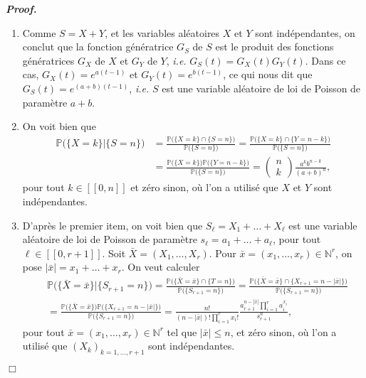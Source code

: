 \documentclass[11pt,a4paper]{article}
\newcommand{\NN}{\mathbb{N}}
\newenvironment{preuve}[1][]
{\vskip 2mm  \noindent\emph{\bf Proof#1. }}{$\Box$ \vskip 2mm}
\let\leq\leqslant
\begin{document}
		\begin{preuve}
			\begin{enumerate}
				\item Comme $S = X + Y$, et les variables aléatoires $X$ et $Y$ sont indépendantes, on conclut que la fonction génératrice 
				$G_{S}$ de $S$ est le produit des fonctions génératrices $G_{X}$ de $X$ et $G_{Y}$ de $Y$, \textit{i.e.} $G_{S}(t) = G_{X}(t) G_{Y}(t)$. 
				Dans ce cas, $G_{X}(t) = e^{a (t-1)}$ et $G_{Y}(t) = e^{b (t-1)}$, ce qui nous dit que 
				$G_{S}(t) = e^{(a+b) (t-1)}$, \textit{i.e.} $S$ est une variable aléatoire de loi de Poisson de paramètre $a + b$. 
				
				\item On voit bien que 
				\begin{align*}
				\mathbb{P}\big(\{X=k\} | \{S=n\}\big) &= \frac{\mathbb{P}\big(\{X=k\} \cap \{S=n\}\big)}{\mathbb{P}\big( \{S=n\}\big)} = \frac{\mathbb{P}\big(\{X=k\} \cap \{Y=n-k\}\big)}{\mathbb{P}\big( \{S=n\}\big)} 
				\\
				&= \frac{\mathbb{P}\big(\{X=k\}\big) \mathbb{P}\big(\{Y=n-k\}\big)}{\mathbb{P}\big( \{S=n\}\big)} = \begin{pmatrix} n \\ k \end{pmatrix} \frac{a^{k} b^{n-k}}{(a+b)^{n}},     
				\end{align*}
				pour tout $k \in [\![ 0, n ]\!]$ et zéro sinon, où l'on a utilisé que $X$ et $Y$ sont indépendantes. 
				
				\item D'après le premier item, on voit bien que $S_{\ell} = X_1+\dots+X_{\ell}$ est une variable aléatoire de loi de Poisson de paramètre $s_{\ell} = a_1+\dots+a_{\ell}$, pour tout $\ell \in [\![ 0, r+1 ]\!]$. 
				Soit $\bar{X} = (X_1,\dots ,X_{r})$. 
				Pour $\bar{x} = (x_1,\dots ,x_{r}) \in \NN^{r}$, on pose $|\bar{x}| = x_1+\dots+x_{r}$. 
				On veut calculer 
				\begin{align*}
				&\mathbb{P}\big(\{\bar{X}=\bar{x}\} | \{S_{r+1}=n\}\big) = \frac{\mathbb{P}\big(\{\bar{X}=\bar{x}\} \cap \{T=n\}\big)}{\mathbb{P}\big( \{S_{r+1}=n\}\big)} = \frac{\mathbb{P}\big(\{\bar{X}=\bar{x}\} \cap \{X_{r+1}=n-|\bar{x}|\}\big)}{\mathbb{P}\big( \{S_{r+1}=n\}\big)} 
				\\
				&= \frac{\mathbb{P}\big(\{\bar{X}=\bar{x}\}\big) \mathbb{P}\big(\{X_{r+1}=n-|\bar{x}|\}\big)}{\mathbb{P}\big( \{S_{r+1}=n\}\big)} = \frac{n!}{(n-|\bar{x}|)! \prod_{i=1}^{r} x_{i}!} \frac{a_{r+1}^{n-|\bar{x}|} \prod_{i=1}^{r} a_{i}^{x_{i}}}{s_{r+1}^{n}},     
				\end{align*}
				pour tout $\bar{x} = (x_1,\dots ,x_{r}) \in \NN^{r}$ tel que $|\bar{x}| \leq n$, et zéro sinon, où l'on a utilisé que $(X_k)_{k=1, \dots, r+1}$ sont indépendantes. 
			\end{enumerate}
		\end{preuve}
		
\end{document}
